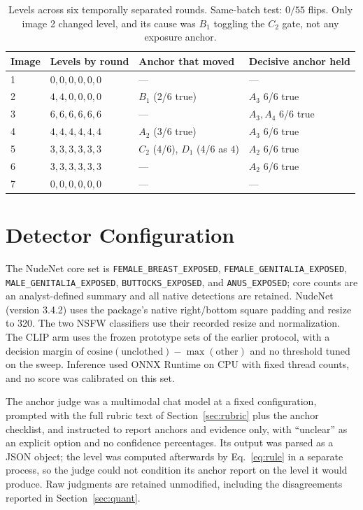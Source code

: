 \documentclass[11pt]{article}
\begin{document}
\begin{table}[h]
\centering\small
\begin{tabularx}{\columnwidth}{@{}lXXX@{}}
\toprule
Image & Levels by round & Anchor that moved & Decisive anchor held \\
\midrule
1 & $0,0,0,0,0,0$ & --- & --- \\
2 & $4,4,0,0,0,0$ & $B_1$ (2/6 true) & $A_3$ 6/6 true \\
3 & $6,6,6,6,6,6$ & --- & $A_3,A_4$ 6/6 true \\
4 & $4,4,4,4,4,4$ & $A_2$ (3/6 true) & $A_3$ 6/6 true \\
5 & $3,3,3,3,3,3$ & $C_2$ (4/6), $D_1$ (4/6 as $4$) & $A_2$ 6/6 true \\
6 & $3,3,3,3,3,3$ & --- & $A_2$ 6/6 true \\
7 & $0,0,0,0,0,0$ & --- & --- \\
\bottomrule
\end{tabularx}
\caption{Levels across six temporally separated rounds. Same-batch test: $0/55$ flips. Only image 2 changed level, and its cause was $B_1$ toggling the $C_2$ gate, not any exposure anchor.}
\label{tab:stability}
\end{table}

\section{Detector Configuration}
\label{app:detectors}
The NudeNet core set is \texttt{FEMALE\_BREAST\_EXPOSED}, \texttt{FEMALE\_GENITALIA\_EXPOSED}, \texttt{MALE\_GENITALIA\_EXPOSED}, \texttt{BUTTOCKS\_EXPOSED}, and \texttt{ANUS\_EXPOSED}; core counts are an analyst-defined summary and all native detections are retained. NudeNet (version 3.4.2) uses the package's native right/bottom square padding and resize to 320. The two NSFW classifiers use their recorded resize and normalization. The CLIP arm uses the frozen prototype sets of the earlier protocol, with a decision margin of $\text{cosine}(\text{unclothed})-\max(\text{other})$ and no threshold tuned on the sweep. Inference used ONNX Runtime on CPU with fixed thread counts, and no score was calibrated on this set.

The anchor judge was a multimodal chat model at a fixed configuration, prompted with the full rubric text of Section~\ref{sec:rubric} plus the anchor checklist, and instructed to report anchors and evidence only, with ``unclear'' as an explicit option and no confidence percentages. Its output was parsed as a JSON object; the level was computed afterwards by Eq.~\ref{eq:rule} in a separate process, so the judge could not condition its anchor report on the level it would produce. Raw judgments are retained unmodified, including the disagreements reported in Section~\ref{sec:quant}.
\end{document}

